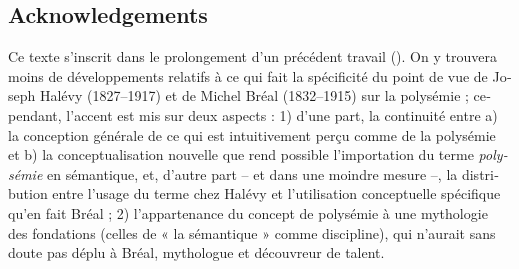 \documentclass[output=paper]{langsci/langscibook}
\begin{document}
\begin{otherlanguage}{french}
\section*{Acknowledgements}
Ce texte s’inscrit dans le prolongement d’un précédent travail (\citealt{courbon_sur_2015}). On y trouvera moins de développements relatifs à ce qui fait la spécificité du point de vue de Joseph Halévy (1827--1917) et de Michel Bréal (1832--1915) sur la polysémie ; cependant, l’accent est mis sur deux aspects : 1) d’une part, la continuité entre a) la conception générale de ce qui est intuitivement perçu comme de la polysémie et b) la conceptualisation nouvelle que rend possible l’importation du terme \textit{polysémie} en sémantique, et, d’autre part – et dans une moindre mesure –, la distribution entre l’usage du terme chez Halévy et l’utilisation conceptuelle spécifique qu’en fait Bréal ; 2) l’appartenance du concept de polysémie à une mythologie des fondations (celles de « la sémantique » comme discipline), qui n’aurait sans doute pas déplu à Bréal, mythologue et découvreur de talent.

{\sloppy\printbibliography[heading=subbibliography,notkeyword=this]}
\end{otherlanguage}
\end{document}
